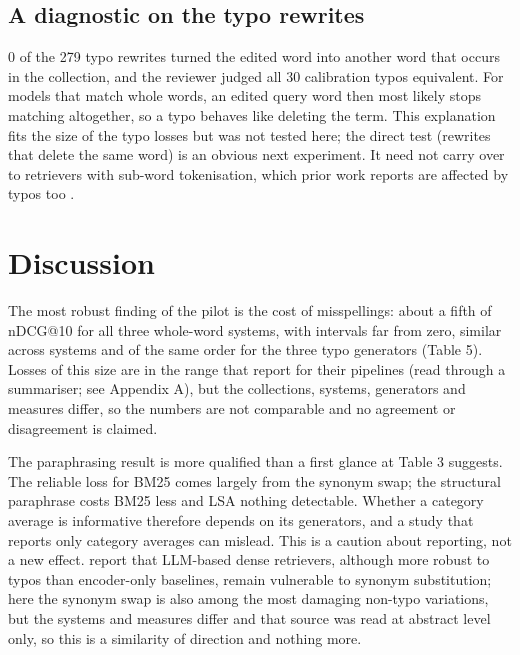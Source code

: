 \documentclass[
  11pt,
]{article}
\begin{document}
\hypertarget{a-diagnostic-on-the-typo-rewrites}{%
\subsection{A diagnostic on the typo
rewrites}\label{a-diagnostic-on-the-typo-rewrites}}

0 of the 279 typo rewrites turned the edited word into another word that
occurs in the collection, and the reviewer judged all 30 calibration
typos equivalent. For models that match whole words, an edited query
word then most likely stops matching altogether, so a typo behaves like
deleting the term. This explanation fits the size of the typo losses but
was not tested here; the direct test (rewrites that delete the same
word) is an obvious next experiment. It need not carry over to
retrievers with sub-word tokenisation, which prior work reports are
affected by typos too \citep{zhuang2021, sidiropoulos2022}.

\hypertarget{discussion}{%
\section{Discussion}\label{discussion}}

The most robust finding of the pilot is the cost of misspellings: about
a fifth of nDCG@10 for all three whole-word systems, with intervals far
from zero, similar across systems and of the same order for the three
typo generators (Table 5). Losses of this size are in the range that
\citet{penha2022} report for their pipelines (read through a summariser;
see Appendix A), but the collections, systems, generators and measures
differ, so the numbers are not comparable and no agreement or
disagreement is claimed.

The paraphrasing result is more qualified than a first glance at Table 3
suggests. The reliable loss for BM25 comes largely from the synonym
swap; the structural paraphrase costs BM25 less and LSA nothing
detectable. Whether a category average is informative therefore depends
on its generators, and a study that reports only category averages can
mislead. This is a caution about reporting, not a new effect.
\citet{li2026} report that LLM-based dense retrievers, although more
robust to typos than encoder-only baselines, remain vulnerable to
synonym substitution; here the synonym swap is also among the most
damaging non-typo variations, but the systems and measures differ and
that source was read at abstract level only, so this is a similarity of
direction and nothing more.
\end{document}
